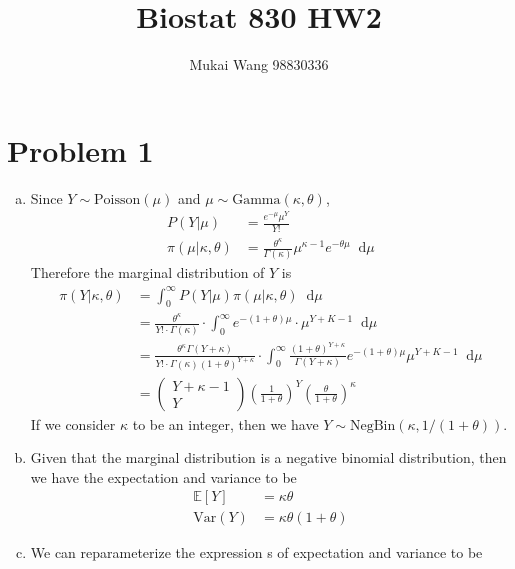 \documentclass[12pt]{article}
\title{Biostat 830 HW2}
\date{}
\author{Mukai Wang 98830336}
\newcommand*\diff{\mathop{}\!\mathrm{d}}
\begin{document}
\maketitle

\section*{Problem 1}

\begin{enumerate}[(a)]
	\item Since $Y\sim \text{Poisson}(\mu)$ and $\mu \sim \text{Gamma}(\kappa, \theta)$, 
	\begin{align*}
	P\left(\left.Y \right\vert\mu \right)& = \frac{e^{-\mu} \mu^{Y}}{Y!}\\
	\pi\left(\left.\mu \right\vert \kappa, \theta\right) &= \frac{\theta^{\kappa}}{\Gamma(\kappa)}\mu^{\kappa - 1}e^{-\theta\mu}\diff \mu 
	\end{align*}
	Therefore the marginal distribution of $Y$ is
	\begin{align*}
		\pi\left(\left.Y\right\vert\kappa, \theta \right)&= \int_{0}^{\infty} P\left(\left.Y \right\vert\mu \right) \pi\left(\left.\mu \right\vert \kappa, \theta\right)\diff \mu\\
		&=\frac{\theta^{\kappa}}{Y!\cdot \Gamma(\kappa)}\cdot \int_{0}^{\infty}e^{-(1+\theta)\mu} \cdot \mu^{Y+K-1}\diff \mu \\
		&=\frac{\theta^{\kappa} \Gamma(Y+\kappa)}{Y! \cdot \Gamma(\kappa) \left(1+\theta\right)^{Y+\kappa} }\cdot \int_{0}^{\infty} \frac{(1+\theta)^{Y+\kappa}}{\Gamma(Y+\kappa)}e^{-(1+\theta)\mu}\mu^{Y+K-1}\diff \mu\\
		&=\begin{pmatrix}Y+\kappa - 1 \\ Y\end{pmatrix}\left(\frac{1}{1+\theta}\right)^{Y}\left(\frac{\theta}{1+\theta}\right)^{\kappa}
	\end{align*}
	If we consider $\kappa$ to be an integer, then we have $Y \sim \text{NegBin}(\kappa, 1/(1+\theta))$.
	\item Given that the marginal distribution is a negative binomial distribution, then we have the expectation and variance to be
	\begin{align*}
		\mathbb{E}[Y] &= \kappa\theta\\
		\text{Var}(Y) &= \kappa\theta(1+\theta)
	\end{align*}
	\item We can reparameterize the expression s of expectation and variance to be

\end{enumerate}
\end{document}
